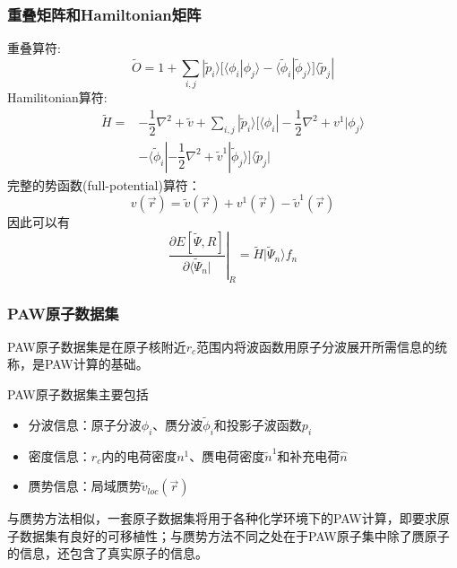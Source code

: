 \documentclass[cjk,slidestop,compress,mathserif,blue]{beamer}
\begin{document}
\frame
{
	\frametitle{重叠矩阵和\textrm{Hamiltonian}矩阵}
重叠算符:
$$\tilde O=1+\sum_{i,j}|\tilde p_i\rangle\bigg[\langle\phi_i|\phi_j\rangle-\langle\tilde\phi_i|\tilde\phi_j\rangle\bigg]\langle\tilde p_j|$$
\textrm{Hamilitonian}算符:
\begin{displaymath}
	\begin{aligned}
		\tilde H=&-\dfrac12\nabla^2+\tilde v+\sum_{i,j}|\tilde p_i\rangle\bigg[\langle\phi_i|-\dfrac12\nabla^2+v^1|\phi_j\rangle\\
			&-\langle\tilde\phi_i|-\dfrac12\nabla^2+\tilde v^1|\tilde\phi_j\rangle\bigg]\langle\tilde p_j| 
	\end{aligned}
\end{displaymath}
	完整的势函数\textrm{(full-potential)}算符：
$$v(\vec r)=\tilde v(\vec r)+v^1(\vec r)-\tilde v^1(\vec r)$$
因此可以有
$$\left.\dfrac{\partial E[\tilde\Psi, R]}{\partial\langle\tilde\Psi_n|}\right|_R=\tilde H|\tilde\Psi_n\rangle f_n$$
}

\frame
{
	\frametitle{\textrm{PAW}原子数据集}
\textrm{PAW}原子数据集是在原子核附近$r_c$范围内将波函数用原子分波展开所需信息的统称，是\textrm{PAW}计算的基础。

\textrm{PAW}原子数据集主要包括
	\begin{itemize}
		\item 分波信息：原子分波$\phi_i$、赝分波$\tilde\phi_i$和投影子波函数$p_i$
		\item 密度信息：$r_c$内的电荷密度$n^1$、赝电荷密度$\tilde n^1$和补充电荷$\hat n$
		\item 赝势信息：局域赝势$\tilde v_{loc}(\vec r)$
	\end{itemize}
	与赝势方法相似，一套原子数据集将用于各种化学环境下的\textrm{PAW}计算，即要求原子数据集有良好的可移植性；与赝势方法不同之处在于\textrm{PAW}原子集中除了赝原子的信息，还包含了真实原子的信息。
}
\end{document}
